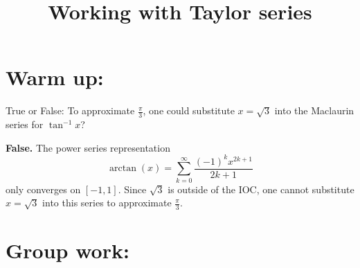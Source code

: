 \documentclass[]{ximera}
\title{Working with Taylor series}
\begin{document}
\begin{abstract}		\end{abstract}
\maketitle



\section{Warm up:}
True or False:  To approximate $\frac{\pi}{3}$, one could substitute $x = \sqrt{3}$ into the Maclaurin series for $\tan^{-1}x$?
	\begin{freeResponse}
	{\bf False.}  The power series representation 
		\[
		\arctan(x) = \sum_{k=0}^\infty \frac{(-1)^k x^{2k+1}}{2k+1}
		\]
	only converges on $[-1,1]$.  
	Since $\sqrt{3}$ is outside of the IOC, one cannot substitute $x=\sqrt{3}$ into this series to approximate $\frac{\pi}{3}$.  
	\end{freeResponse}	
\begin{instructorNotes}
\end{instructorNotes}







\section{Group work:}
\end{document}
